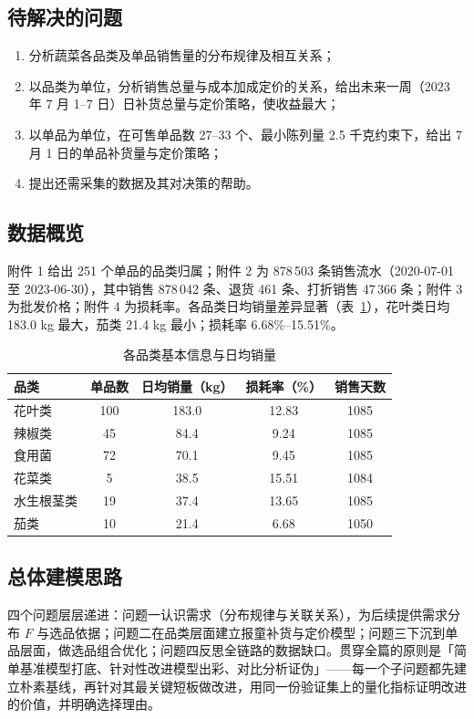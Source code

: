 \documentclass[12pt]{ctexart}
\begin{document}
\subsection{待解决的问题}
\begin{enumerate}
\item 分析蔬菜各品类及单品销售量的分布规律及相互关系；
\item 以品类为单位，分析销售总量与成本加成定价的关系，给出未来一周（2023 年 7 月 1--7 日）日补货总量与定价策略，使收益最大；
\item 以单品为单位，在可售单品数 27--33 个、最小陈列量 2.5 千克约束下，给出 7 月 1 日的单品补货量与定价策略；
\item 提出还需采集的数据及其对决策的帮助。
\end{enumerate}

\subsection{数据概览}
附件 1 给出 251 个单品的品类归属；附件 2 为 878\,503 条销售流水（2020-07-01 至 2023-06-30），其中销售 878\,042 条、退货 461 条、打折销售 47\,366 条；附件 3 为批发价格；附件 4 为损耗率。各品类日均销量差异显著（表~\ref{tab:overview}），花叶类日均 183.0 kg 最大，茄类 21.4 kg 最小；损耗率 6.68\%--15.51\%。

\begin{table}[htbp]
\centering
\caption{各品类基本信息与日均销量}
\label{tab:overview}
\begin{tabular}{lcccc}
\toprule
品类 & 单品数 & 日均销量（kg） & 损耗率（\%） & 销售天数 \\
\midrule
花叶类 & 100 & 183.0 & 12.83 & 1085 \\
辣椒类 & 45 & 84.4 & 9.24 & 1085 \\
食用菌 & 72 & 70.1 & 9.45 & 1085 \\
花菜类 & 5 & 38.5 & 15.51 & 1084 \\
水生根茎类 & 19 & 37.4 & 13.65 & 1085 \\
茄类 & 10 & 21.4 & 6.68 & 1050 \\
\bottomrule
\end{tabular}
\end{table}

\subsection{总体建模思路}
四个问题层层递进：问题一认识需求（分布规律与关联关系），为后续提供需求分布 $F$ 与选品依据；问题二在品类层面建立报童补货与定价模型；问题三下沉到单品层面，做选品组合优化；问题四反思全链路的数据缺口。贯穿全篇的原则是「简单基准模型打底、针对性改进模型出彩、对比分析证伪」——每一个子问题都先建立朴素基线，再针对其最关键短板做改进，用同一份验证集上的量化指标证明改进的价值，并明确选择理由。
\end{document}
